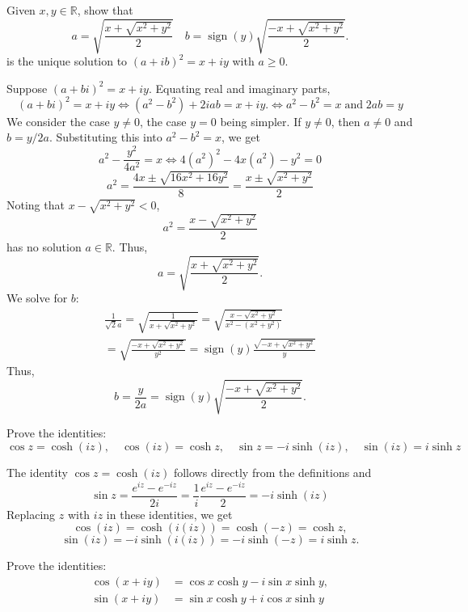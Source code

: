 \documentclass[answers, 12pt]{exam}
\newcommand{\RR}{\mathbb{R}}
\DeclareMathOperator{\sign}{sign}
\begin{document}
\begin{questions}
\question\label{Q:sqrt}
Given $x,y\in\RR$, show that 
\begin{equation}\label{E:sqrt}
    a=\sqrt{\frac{x+\sqrt{x^2+y^2}}2}\quad
    b=\sign(y)\sqrt{\frac{-x+\sqrt{x^2+y^2}}2}.
\end{equation}
is the unique solution to $(a+ib)^2=x+iy$ with $a\geq 0$.
\begin{solution}
    Suppose $(a+bi)^2 = x+iy$. Equating real and imaginary parts,
    \[
        (a+bi)^2 = x+iy\Longleftrightarrow (a^2-b^2) + 2iab = x + iy.
        \Longleftrightarrow a^2-b^2=x\;\text{and}\;2ab=y
    \]
    We consider the case $y\neq 0$, the case $y=0$ being simpler. If $y\neq 0$, then $a\neq 0$ and $b=y/2a$. Substituting this into $a^2-b^2=x$, we get
    \[
        a^2 - \frac{y^2}{4a^2} = x\Longleftrightarrow 4(a^2)^2 - 4x(a^2) - y^2=0
    \]
    \[
        a^2 = \frac{4x\pm \sqrt{16x^2 + 16y^2}}{8} = \frac{x\pm \sqrt{x^2 + y^2}}{2}
    \]
    Noting that $x-\sqrt{x^2+y^2}<0$,
    \[
        a^2=\frac{x-\sqrt{x^2+y^2}}2
    \]
    has no solution $a\in\RR$. Thus,
    \[
        a = \sqrt{\frac{x+\sqrt{x^2+y^2}}2}.
    \]
    We solve for $b$:
    \begin{multline*}
        \frac1{\sqrt2a} = \sqrt{\frac1{x+\sqrt{x^2+y^2}}} = \sqrt{\frac{x - \sqrt{x^2+y^2}}{x^2 - (x^2+y^2)}}\\ = \sqrt{\frac{-x+\sqrt{x^2+y^2}}{y^2}}
        =\sign(y)\frac{\sqrt{-x+\sqrt{x^2+y^2}}}{y}
    \end{multline*}
    Thus,
    \[
b = \frac{y}{2a} = \sign(y)\sqrt{\frac{-x+\sqrt{x^2+y^2}}{2}}.
    \]
\end{solution}


\question Prove the identities:
\[
    \cos z = \cosh(iz),\quad \cos(iz) = \cosh z,\quad
    \sin z = -i\sinh(iz),\quad \sin(iz) = i\sinh z
\]
\begin{solution}
    The identity $\cos z=\cosh(iz)$ follows directly from the definitions and
    \[
        \sin z = \frac{e^{iz} - e^{-iz}}{2i} = \frac1i\frac{e^{iz} - e^{-iz}}{2} = -i\sinh(iz)
    \]
    Replacing $z$ with $iz$ in these identities, we get
    \[
        \cos(iz) = \cosh(i(iz)) = \cosh(-z) = \cosh z,
    \]
    \[
        \sin(iz) = -i\sinh(i(iz)) = -i\sinh(-z) = i\sinh z.
    \]
\end{solution}

\question
Prove the identities:
\begin{align*}
    \cos(x+iy) &= \cos x\cosh y - i\sin x\sinh y,\\
    \sin(x+iy) &= \sin x\cosh y + i\cos x\sinh y
\end{align*}


\end{questions}
\end{document}
